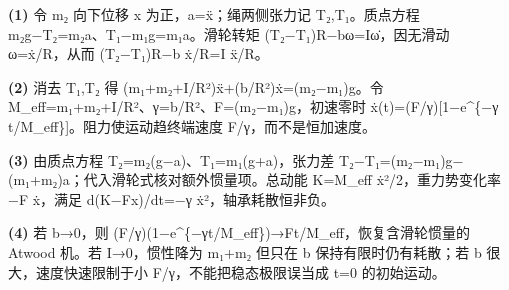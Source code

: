 \par\noindent\textbf{(1)} 令 m₂ 向下位移 x 为正，a=ẍ；绳两侧张力记 T₂,T₁。质点方程 m₂g−T₂=m₂a、T₁−m₁g=m₁a。滑轮转矩 (T₂−T₁)R−bω=Iω̇，因无滑动 ω=ẋ/R，从而 (T₂−T₁)R−b ẋ/R=I ẍ/R。
\par\noindent\textbf{(2)} 消去 T₁,T₂ 得 (m₁+m₂+I/R²)ẍ+(b/R²)ẋ=(m₂−m₁)g。令 M\_eff=m₁+m₂+I/R²、γ=b/R²、F=(m₂−m₁)g，初速零时 ẋ(t)=(F/γ)[1−e\textasciicircum{}\{−γ t/M\_eff\}]。阻力使运动趋终端速度 F/γ，而不是恒加速度。
\par\noindent\textbf{(3)} 由质点方程 T₂=m₂(g−a)、T₁=m₁(g+a)，张力差 T₂−T₁=(m₂−m₁)g−(m₁+m₂)a；代入滑轮式核对额外惯量项。总动能 K=M\_eff ẋ²/2，重力势变化率 −F ẋ，满足 d(K−Fx)/dt=−γ ẋ²，轴承耗散恒非负。
\par\noindent\textbf{(4)} 若 b→0，则 (F/γ)(1−e\textasciicircum{}\{−γt/M\_eff\})→Ft/M\_eff，恢复含滑轮惯量的 Atwood 机。若 I→0，惯性降为 m₁+m₂ 但只在 b 保持有限时仍有耗散；若 b 很大，速度快速限制于小 F/γ，不能把稳态极限误当成 t=0 的初始运动。
